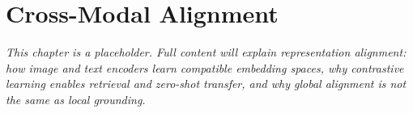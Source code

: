 \chapter{Cross-Modal Alignment}
\label{ch:cross-modal-alignment}


\textit{This chapter is a placeholder. Full content will explain representation alignment: how image and text encoders learn compatible embedding spaces, why contrastive learning enables retrieval and zero-shot transfer, and why global alignment is not the same as local grounding.}
